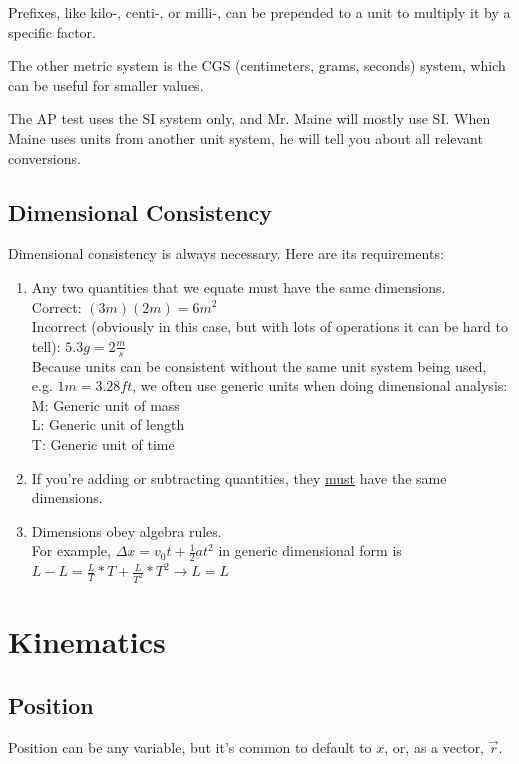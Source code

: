 \documentclass{article}
\begin{document}
Prefixes, like kilo-, centi-, or milli-, can be prepended to a unit to multiply it by a specific factor.

The other metric system is the CGS (centimeters, grams, seconds) system, which can be useful for smaller values.

The AP test uses the SI system only, and Mr. Maine will mostly use SI. When Maine uses units from another unit system, he will tell you about all relevant conversions.

\subsection{Dimensional Consistency}
Dimensional consistency is always necessary. Here are its requirements:
\begin{enumerate}
    \item Any two quantities that we equate must have the same dimensions. \\ Correct: $ (3m)(2m) = 6m^2 $ \\ Incorrect (obviously in this case, but with lots of operations it can be hard to tell):
        $ 5.3g = 2\frac{m}{s} $ \\ Because units can be consistent without the same unit system being used, e.g. $ 1m = 3.28ft $, we often use generic units when doing dimensional analysis: \\
        M: Generic unit of mass \\ L: Generic unit of length \\ T: Generic unit of time
    \item If you're adding or subtracting quantities, they \uline{must} have the same dimensions.
    \item Dimensions obey algebra rules. \\ For example, 
        $ \Delta x = v_0 t + \frac{1}{2}at^2 $
        in generic dimensional form is
        $ L - L = \frac{L}{T} * {T} + \frac{L}{T^2} * {T^2} \to L = L$
\end{enumerate}

\newpage
\section{Kinematics}

\subsection{Position}
Position can be any variable, but it's common to default to $ x $, or, as a vector, $ \vec{r} $.
\end{document}
